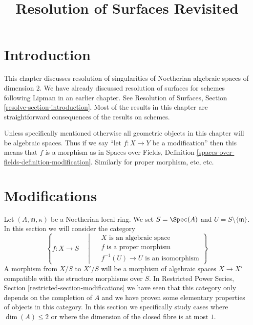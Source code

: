 

%


\title{Resolution of Surfaces Revisited}


\maketitle

\label{section-phantom}

\tableofcontents

\section{Introduction}
\label{section-introduction}

\noindent
This chapter discusses resolution of singularities of
Noetherian algebraic spaces of dimension $2$.
We have already discussed resolution of surfaces
for schemes following Lipman \cite{Lipman} in an earlier
chapter. See
Resolution of Surfaces, Section \ref{resolve-section-introduction}.
Most of the results in this chapter are straightforward
consequences of the results on schemes.

\medskip\noindent
Unless specifically mentioned otherwise all geometric objects
in this chapter will be algebraic spaces. Thus if we say
``let $f : X \to Y$ be a modification'' then this means that
$f$ is a morphism as in Spaces over Fields, Definition
\ref{spaces-over-fields-definition-modification}.
Similarly for proper morphism, etc, etc.










\section{Modifications}
\label{section-modifications}

\noindent
Let $(A, \mathfrak m, \kappa)$ be a Noetherian local ring. We set
$S = \Spec(A)$ and $U = S \setminus \{\mathfrak m\}$. In this section
we will consider the category
\begin{equation}
\label{equation-modification}
\left\{
f : X \longrightarrow S
\quad \middle| \quad
\begin{matrix}
X\text{ is an algebraic space}\\
f\text{ is a proper morphism}\\
f^{-1}(U) \to U\text{ is an isomorphism}
\end{matrix}
\right\}
\end{equation}
A morphism from $X/S$ to $X'/S$ will be a morphism of algebraic spaces
$X \to X'$ compatible with the structure morphisms over $S$. In
Restricted Power Series, Section \ref{restricted-section-modifications}
we have seen that this category only depends on the completion of $A$
and we have proven some elementary properties of objects in this category.
In this section we specifically study cases where
$\dim(A) \leq 2$ or where the dimension of the closed fibre is at most $1$.

